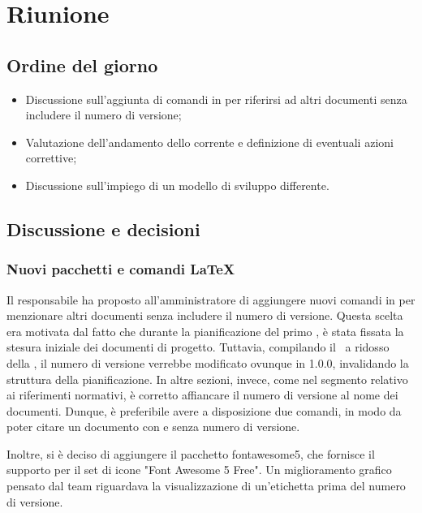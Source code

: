 \section{Riunione}
\subsection{Ordine del giorno}
\begin{itemize}
	\item Discussione sull'aggiunta di comandi in  per riferirsi ad altri documenti senza includere il numero di versione;
  \item Valutazione dell'andamento dello  corrente e definizione di eventuali azioni correttive;
  \item Discussione sull'impiego di un modello di sviluppo differente.
\end{itemize}

\subsection{Discussione e decisioni}

\subsubsection{Nuovi pacchetti e comandi LaTeX}
\par Il responsabile ha proposto all'amministratore di aggiungere nuovi comandi in  per menzionare altri documenti senza includere il numero di versione. Questa scelta era motivata dal fatto che durante la pianificazione del primo , è stata fissata la stesura iniziale dei documenti di progetto. Tuttavia, compilando il \PdP\ a ridosso della , il numero di versione verrebbe modificato ovunque in 1.0.0, invalidando la struttura della pianificazione. In altre sezioni, invece, come nel segmento relativo ai riferimenti normativi, è corretto affiancare il numero di versione al nome dei documenti. Dunque, è preferibile avere a disposizione due comandi, in modo da poter citare un documento con e senza numero di versione.
\par Inoltre, si è deciso di aggiungere il pacchetto fontawesome5, che fornisce il supporto  per il set di icone "Font Awesome 5 Free". Un miglioramento grafico pensato dal team riguardava la visualizzazione di un'etichetta prima del numero di versione.

